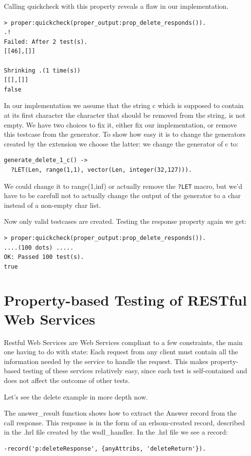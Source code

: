 \documentclass[submission,copyright,a4]{eptcs}
\newcommand{\LET}{\texttt{?LET}\xspace}
\begin{document}
Calling quickcheck with this property reveals a flaw in our implementation.
\begin{lstlisting}
> proper:quickcheck(proper_output:prop_delete_responds()). 
.!
Failed: After 2 test(s).
[[46],[]]

Shrinking .(1 time(s))
[[],[]]
false
\end{lstlisting}

In our implementation we assume that the string c which is supposed to contain at its first character the character that should be removed from the string, is not empty. We have two choices to fix it, either fix our implementation, or remove this testcase from the generator. To show how easy it is to change the generators created by the extension we choose the latter: we change the generator of c to:

\begin{lstlisting}
generate_delete_1_c() ->
  ?LET(Len, range(1,1), vector(Len, integer(32,127))).
\end{lstlisting}
We could change it to range(1,inf) or actually remove the \LET macro, but we'd have to be carefull not to actually change the output of the generator to a char instead of a non-empty char list.

Now only valid testcases are created. Testing the response property again we get:
\begin{lstlisting}
> proper:quickcheck(proper_output:prop_delete_responds()).
....(100 dots) .....
OK: Passed 100 test(s).
true
\end{lstlisting}

\section{Property-based Testing of RESTful Web Services}

Restful Web Services are Web Services compliant to a few constraints, the main one having to do with state: Each request from any client must contain all the information needed by the service to handle the request. This makes property-based testing of these services relatively easy, since each test is self-contained and does not affect the outcome of other tests. 

Let's see the delete example in more depth now. 

The answer\_result function shows how to extract the Answer record from the call response. This response is in the form of an erlsom-created record, described in the .hrl file created by the wsdl\_handler. In the .hrl file we see a record: 
\begin{lstlisting}
-record('p:deleteResponse', {anyAttribs, 'deleteReturn'}).
\end{lstlisting}
\end{document}

